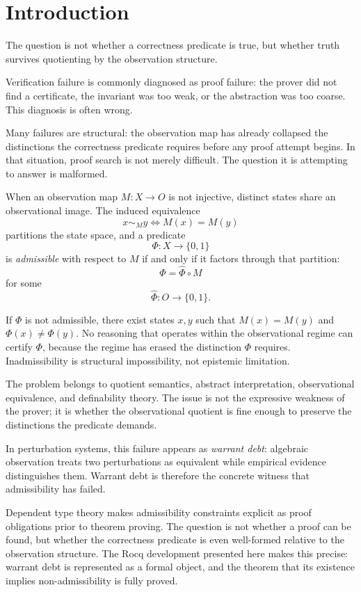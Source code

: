 \documentclass[12pt]{article}
\theoremstyle{plain}
\theoremstyle{definition}
\theoremstyle{remark}
\begin{document}
\tableofcontents
\newpage

\section{Introduction}
\label{sec:intro}

The question is not whether a correctness predicate is true,
but whether truth survives quotienting by the observation structure.

Verification failure is commonly diagnosed as proof failure: the prover
did not find a certificate, the invariant was too weak, or the
abstraction was too coarse.
This diagnosis is often wrong.

Many failures are structural: the observation map has already collapsed
the distinctions the correctness predicate requires before any proof
attempt begins.
In that situation, proof search is not merely difficult.
The question it is attempting to answer is malformed.

When an observation map $M : X \to O$ is not injective, distinct states
share an observational image.
The induced equivalence
\[
x \sim_M y \iff M(x) = M(y)
\]
partitions the state space, and a predicate
\[
\Phi : X \to \{0,1\}
\]
is \emph{admissible} with respect to $M$ if and only if it factors
through that partition:
\[
\Phi = \hat{\Phi} \circ M
\]
for some
\[
\hat{\Phi} : O \to \{0,1\}.
\]

If $\Phi$ is not admissible, there exist states $x, y$ such that
$M(x) = M(y)$ and $\Phi(x) \neq \Phi(y)$.
No reasoning that operates within the observational regime can certify
$\Phi$, because the regime has erased the distinction $\Phi$ requires.
Inadmissibility is structural impossibility, not epistemic limitation.

The problem belongs to quotient semantics, abstract interpretation,
observational equivalence, and definability theory.
The issue is not the expressive weakness of the prover; it is whether
the observational quotient is fine enough to preserve the distinctions
the predicate demands.

In perturbation systems, this failure appears as
\emph{warrant debt}: algebraic observation treats two perturbations as
equivalent while empirical evidence distinguishes them.
Warrant debt is therefore the concrete witness that admissibility has
failed.

Dependent type theory makes admissibility constraints explicit as proof
obligations prior to theorem proving.
The question is not whether a proof can be found, but whether the
correctness predicate is even well-formed relative to the observation
structure.
The Rocq development presented here makes this precise: warrant debt
is represented as a formal object, and the theorem that its existence
implies non-admissibility is fully proved.
\end{document}
